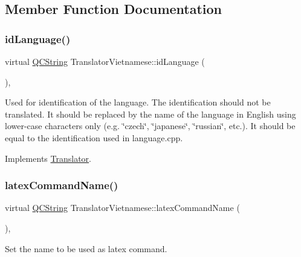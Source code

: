 \subsection{Member Function Documentation}
\mbox{\label{class_translator_vietnamese_a553f57360200d8d7120013cc10d25c48}} 
\subsubsection{\texorpdfstring{idLanguage()}{idLanguage()}}
{\footnotesize\ttfamily virtual \mbox{\hyperlink{class_q_c_string}{Q\+C\+String}} Translator\+Vietnamese\+::id\+Language (\begin{DoxyParamCaption}{ }\end{DoxyParamCaption})\hspace{0.3cm}{\ttfamily [inline]}, {\ttfamily [virtual]}}

Used for identification of the language. The identification should not be translated. It should be replaced by the name of the language in English using lower-\/case characters only (e.\+g. \char`\"{}czech\char`\"{}, \char`\"{}japanese\char`\"{}, \char`\"{}russian\char`\"{}, etc.). It should be equal to the identification used in language.\+cpp. 

Implements \mbox{\hyperlink{class_translator}{Translator}}.

\mbox{\label{class_translator_vietnamese_aa25246769e54e9e07fa253a31666b824}} 
\subsubsection{\texorpdfstring{latexCommandName()}{latexCommandName()}}
{\footnotesize\ttfamily virtual \mbox{\hyperlink{class_q_c_string}{Q\+C\+String}} Translator\+Vietnamese\+::latex\+Command\+Name (\begin{DoxyParamCaption}{ }\end{DoxyParamCaption})\hspace{0.3cm}{\ttfamily [inline]}, {\ttfamily [virtual]}}

Set the name to be used as latex command. 

